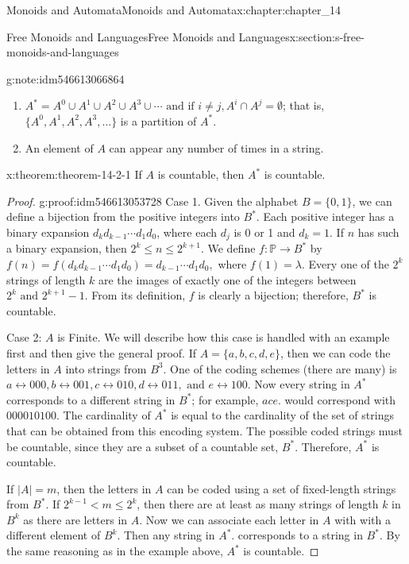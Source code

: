 \documentclass[oneside,10pt,]{book}
\numberwithin{equation}{section}
\begin{document}
\begin{chapterptx}{Monoids and Automata}{}{Monoids and Automata}{}{}{x:chapter:chapter_14}
\begin{sectionptx}{Free Monoids and Languages}{}{Free Monoids and Languages}{}{}{x:section:s-free-monoids-and-languages}
\begin{note}{}{g:note:idm546613066864}
\begin{enumerate}[label=(\alph*)]
\item{}\(A^*=A^0\cup A^1\cup A^2\cup A^3\cup \cdots \textrm{ and if } i\neq j,A^i\cap A^j=\emptyset\); that is, \(\{A^0,A^1,A^2,A^3,\ldots \}\) is a partition of \(A^*\).%
\item{}An element of \(A\) can appear any number of times in a string.%
\end{enumerate}
%
\end{note}
\begin{theorem}{}{}{x:theorem:theorem-14-2-1}%
If \(A\) is countable, then \(A^*\) is countable.%
\end{theorem}
\begin{proof}{}{g:proof:idm546613053728}
Case 1. Given the alphabet \(B=\{0,1\}\), we can define a bijection from the positive integers into \(B^*\). Each positive integer has a binary expansion \(d_kd_{k-1}\cdots d_1d_0\), where each \(d_j\) is 0 or 1 and \(d_k=1\). If \(n\) has such a binary expansion, then \(2^k \leq n\leq 2^{k+1}\). We define \(f:\mathbb{P}\to B^*\) by \(f(n)=f\left(d_kd_{k-1}\cdots  d_1d_0\right)=d_{k-1}\cdots d_1d_0,\)  where  \(f(1)=\lambda\). Every one of the \(2^k\) strings of length \(k\) are the images of exactly one of the integers between \(2^k\textrm{ and } 2^{k+1}-1.\) From its definition, \(f\) is clearly a bijection; therefore, \(B^*\) is countable.%
\par
Case 2: \(A\) is Finite. We will describe how this case is handled with an example first and then give the general proof. If \(A=\{a,b,c,d,e\}\), then we can code the letters in \(A\) into strings from \(B^3\). One of the coding schemes (there are many) is \(a\leftrightarrow 000, b\leftrightarrow
001, c\leftrightarrow 010, d\leftrightarrow 011, \textrm{ and } e\leftrightarrow 100\). Now every string in \(A^*\) corresponds to a different string in \(B^*\); for example, \(ace\).  would correspond with \(000010100\). The cardinality of \(A^*\) is equal to the cardinality of the set of strings that can be obtained from this encoding system. The possible coded strings must be countable, since they are a subset of a countable set, \(B^*\). Therefore, \(A^*\) is countable.%
\par
If \(\lvert A\rvert =m\), then the letters in \(A\) can be coded using a set of fixed-length strings from \(B^*\). If \(2^{k-1} < m \leq 2^k\), then there are at least as many strings of length \(k\) in \(B^k\) as there are letters in \(A\). Now we can associate each letter in \(A\) with with a different element of \(B^k\). Then any string in \(A^*\).  corresponds to a string in \(B^*\).  By the same reasoning as in the example above, \(A^*\) is countable.%

\end{proof}
\end{sectionptx}
\end{chapterptx}
\end{document}
